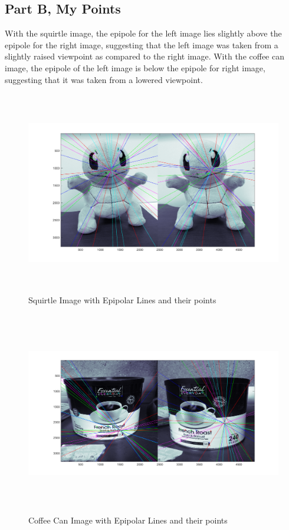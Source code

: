 \documentclass[11pt,psfig]{article}
\begin{document}
\newpage

\subsection*{Part B, My Points}

With the squirtle image, the epipole for the left image lies slightly above the epipole for the right image, suggesting that the left image was taken from a slightly raised viewpoint as compared to the right image. With the coffee can image, the epipole of the left image is below the epipole for right image, suggesting that it was taken from a lowered viewpoint. 

\begin{figure}[H]
\centering
\includegraphics[height=3.5in]{squirtle_prob2Epipolar.png}
\caption{Squirtle Image with Epipolar Lines and their points}
\label{p2g}
\end{figure}

\begin{figure}[H]
\centering
\includegraphics[height=3.5in]{coffeeCan_prob2Epipolar.png}
\caption{Coffee Can Image with Epipolar Lines and their points}
\label{p2h}
\end{figure}
\end{document}

